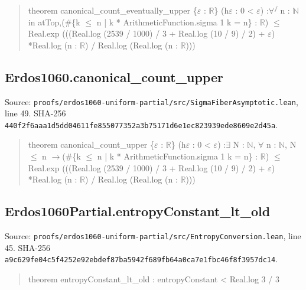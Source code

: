 \documentclass[11pt,a4paper]{article}
\begin{document}
\begin{quote}\small\ttfamily theorem canonical\_count\_eventually\_upper \{\ensuremath{\varepsilon} : \ensuremath{\mathbb{R}}\} (h\ensuremath{\varepsilon} : 0 < \ensuremath{\varepsilon}) :\newline \ensuremath{\forall}\ensuremath{^{f}} n : \ensuremath{\mathbb{N}} in atTop,\newline (\#\{k \ensuremath{\leq} n | k * ArithmeticFunction.sigma 1 k = n\} : \ensuremath{\mathbb{R}}) \ensuremath{\leq}\newline Real.exp (((Real.log (2539 / 1000) / 3 + Real.log (10 / 9) / 2) + \ensuremath{\varepsilon}) *\newline Real.log (n : \ensuremath{\mathbb{R}}) / Real.log (Real.log (n : \ensuremath{\mathbb{R}})))\end{quote}
\subsection{Erdos1060.canonical\_count\_upper}
Source: \texttt{proofs/erdos1060-uniform-partial/src/SigmaFiberAsymptotic.lean}, line 49. SHA-256 \texttt{440f2f6aaa1d5dd04611fe855077352a3b75171d6e1ec823939ede8609e2d45a}.

\begin{quote}\small\ttfamily theorem canonical\_count\_upper \{\ensuremath{\varepsilon} : \ensuremath{\mathbb{R}}\} (h\ensuremath{\varepsilon} : 0 < \ensuremath{\varepsilon}) :\newline \ensuremath{\exists} N : \ensuremath{\mathbb{N}}, \ensuremath{\forall} n : \ensuremath{\mathbb{N}}, N \ensuremath{\leq} n \ensuremath{\to}\newline (\#\{k \ensuremath{\leq} n | k * ArithmeticFunction.sigma 1 k = n\} : \ensuremath{\mathbb{R}}) \ensuremath{\leq}\newline Real.exp (((Real.log (2539 / 1000) / 3 + Real.log (10 / 9) / 2) + \ensuremath{\varepsilon}) *\newline Real.log (n : \ensuremath{\mathbb{R}}) / Real.log (Real.log (n : \ensuremath{\mathbb{R}})))\end{quote}
\subsection{Erdos1060Partial.entropyConstant\_lt\_old}
Source: \texttt{proofs/erdos1060-uniform-partial/src/EntropyConversion.lean}, line 45. SHA-256 \texttt{a9c629fe04c5f4252e92ebdef87ba5942f689fb64a0ca7e1fbc46f8f3957dc14}.

\begin{quote}\small\ttfamily theorem entropyConstant\_lt\_old : entropyConstant < Real.log 3 / 3\end{quote}
\end{document}
